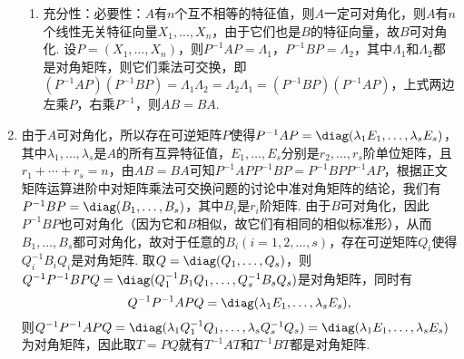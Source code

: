 \begin{exercise}
\begin{exgroup}
\begin{answer}
\begin{enumerate}
\begin{enumerate}
                          \item 充分性：必要性：$A$有$n$个互不相等的特征值，则$A$一定可对角化，则$A$有$n$个线性无关特征向量$X_1,\ldots,X_n$，由于它们也是$B$的特征向量，故$B$可对角化. 设$P=(X_1,\ldots,X_n)$，则$P^{-1}AP=\varLambda_1$，$P^{-1}BP=\varLambda_2$，其中$\varLambda_1$和$\varLambda_2$都是对角矩阵，则它们乘法可交换，即$(P^{-1}AP)(P^{-1}BP)=\varLambda_1\varLambda_2=\varLambda_2\varLambda_1=(P^{-1}BP)(P^{-1}AP)$，上式两边左乘$P$，右乘$P^{-1}$，则$AB=BA$.
                      \end{enumerate}

                \item 由于$A$可对角化，所以存在可逆矩阵$P$使得$P^{-1}AP=\diag(\lambda_1E_1,\ldots,\lambda_sE_s)$，其中$\lambda_1,\ldots,\lambda_s$是$A$的所有互异特征值，$E_1,\ldots,E_s$分别是$r_2,\ldots,r_s$阶单位矩阵，且$r_1+\cdots+r_s=n$，由$AB=BA$可知$P^{-1}APP^{-1}BP=P^{-1}BPP^{-1}AP$，根据正文矩阵运算进阶中对矩阵乘法可交换问题的讨论中准对角矩阵的结论，我们有$P^{-1}BP=\diag(B_1,\ldots,B_s)$，其中$B_i$是$r_i$阶矩阵. 由于$B$可对角化，因此$P^{-1}BP$也可对角化（因为它和$B$相似，故它们有相同的相似标准形），从而$B_1,\ldots,B_s$都可对角化，故对于任意的$B_i(i=1,2,\ldots,s)$，存在可逆矩阵$Q_i$使得$Q_i^{-1}B_iQ_i$是对角矩阵. 取$Q=\diag(Q_1,\ldots,Q_s)$，则$Q^{-1}P^{-1}BPQ=\diag(Q_1^{-1}B_1Q_1,\ldots,Q_s^{-1}B_sQ_s)$是对角矩阵，同时有
                      \[Q^{-1}P^{-1}APQ=\diag(\lambda_1E_1,\ldots,\lambda_sE_s),\]
                      则$Q^{-1}P^{-1}APQ=\diag(\lambda_1Q_1^{-1}Q_1,\ldots,\lambda_sQ_s^{-1}Q_s)=\diag(\lambda_1E_1,\ldots,\lambda_sE_s)$为对角矩阵，因此取$T=PQ$就有$T^{-1}AT$和$T^{-1}BT$都是对角矩阵.
            \end{enumerate}
        \end{answer}


\end{exgroup}
\end{exercise}
